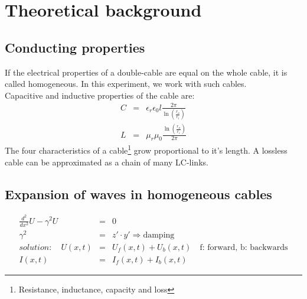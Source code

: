 \section{Theoretical background}
\subsection{Conducting properties}
If the electrical properties of a double-cable are equal on the whole cable, it is called homogeneous. In this experiment, we work with such cables.\\
Capacitive and inductive properties of the cable are:
\begin{eqnarray*}
C&=&\epsilon_r\epsilon_0l\frac{2\pi}{\ln\left(\frac{r_a}{r_i}\right)}\\
L&=&\mu_r\mu_0\frac{\ln\left(\frac{r_a}{r_i}\right)}{2\pi}
\end{eqnarray*}
The four characteristics of a cable\footnote{Resistance, inductance, capacity and loss} grow proportional to it's length. A lossless cable can be approximated as a chain of many LC-links.
\subsection{Expansion of waves in homogeneous cables}
\begin{eqnarray*}
	\frac{d^2}{dx^2}U-\gamma^2U&=&0\\
	\gamma^2&=&z'\cdot y'\Rightarrow\text{damping}\\
	solution: \quad U(x,t)&=&U_f(x,t)+U_b(x,t) \quad \text{f: forward, b: backwards}\\
	I(x,t)&=&I_f(x,t)+I_b(x,t)
\end{eqnarray*}